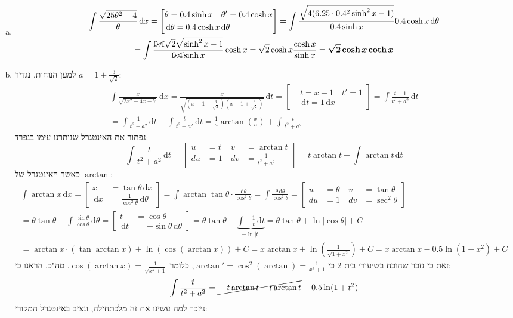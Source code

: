 \documentclass[]{article}
\newcommand\tant  {\tan \theta}
\newcommand\sinhx {\sinh x}
\newcommand\coshx {\cosh x}
\newcommand\dx    {\,\mathrm{d}x}
\newcommand\dt    {\,\mathrm{d}t}
\newcommand\dtt   {\,\mathrm{d}\theta}
\newcommand\ptt[3]{\csb{\begin{aligned}
			&\theta = #1 \quad \theta' = #2 \\
			&\dtt = #2 #3
\end{aligned}}}
\newcommand\pt[3]{\csb{\begin{aligned}
			&t = #1 \quad t' = #2 \\
			&\dt = #2 \dx #3
\end{aligned}}}
\newcommand\pts[2]{\csb{\begin{aligned}
t &= #1 \quad \\
\dt &= #2
\end{aligned}}}
\newcommand\pxs[2]{\csb{\begin{aligned}
x &= #1\\
\dx &= #2
\end{aligned}}}
\newcommand\udv[4]{\csb{\begin{aligned}
			u &= #1  \ & v &= #3 \\
			du &= #2 \ & dv &= #4
\end{aligned}}}
\newcommand\ta    {\theta}
\newcommand\cl [1]    {\left ( #1 \right )}
\newcommand\csb[1]    {\left [ #1 \right ]}
\begin{document}
	\section{}
	\begin{enumerate}[a.]
		\item 
			\begin{multline*}
				\int \frac{\sqrt{25\ta^2 - 4}}{\ta}\dx = \ptt{0.4\sinhx}{0.4\coshx}{\dtt} = \int \frac{\sqrt{4(6.25 \cdot 0.4^2\sinh^2x - 1)}}{0.4\sinhx} 0.4\coshx\dtt \\
				= \int \frac{\cancel{0.4}\sqrt2\sqrt{\sinh^2x - 1}}{\cancel{0.4}\sinhx}\coshx = \sqrt{2}\coshx \frac{\coshx}{\sinhx} = \bm{\sqrt2 \coshx \coth x}
			\end{multline*}
		\item למען הנוחות, נגדיר $a = 1 + \frac{3}{\sqrt2}$: 
			\begin{multline*}
				\int \frac{x}{\sqrt{2x^2 - 4x - 7}} \dx = \frac{x}{\sqrt{\cl{x - 1 - \frac{3}{\sqrt2}}\cl{x - 1 + \frac{3}{\sqrt2}}}} \dt = \pt{x - 1}{1}{} = \int \frac{t + 1}{t^2 + a^2}\dt \\
				= \int \frac{1}{t^2 + a^2} \dt + \int \frac{t}{t^2 + a^2} \dt = \frac{1}{a}\arctan\cl{\frac{x}{a}} + \int \frac{t}{t^2 + a^2}
			\end{multline*}
			נפתור את האינטגרל שנותרנו עימו בנפרד: 
			\[ \int \frac{t}{t^2 + a^2} \dt = \udv{t}{1}{\arctan t}{\tfrac{1}{t^2 + a^2}} = t \arctan t - \int \arctan t \dt \]
			כאשר האינטגרל של $\arctan$: 
			\begin{multline*}
				\int \arctan x \dx = \pxs{\tant\dx}{\tfrac{1}{\cos^2\ta}\dtt} = \int \arctan \tant \cdot \frac{\dtt}{\cos^2 \ta} = \int \frac{\ta \dtt}{\cos^2\ta} = \udv{\ta}{1}{\tan\ta}{\sec^2\ta} \\
				= \ta \tan \ta - \int \frac{\sin\ta}{\cos\ta}\dtt = \pts{\cos \ta}{-\sin \ta \dtt} = \ta \tan \ta  - \underbrace{\int -\frac{1}{t} \dt}_{-\ln |t|} = \ta \tan \ta + \ln |\cos \ta| + C \\
				= \arctan x \cdot (\tan \arctan x) + \ln (\cos(\arctan x)) + C = x \arctan x + \ln \cl{\tfrac{1}{\sqrt{1 + x^2}}} + C = x\arctan x - 0.5 \ln (1 + x^2) + C
			\end{multline*}
			זאת כי נזכר שהוכח בשיעורי בית 2 כי $\arctan' = \cos^2(\arctan) = \frac{1}{x^2 + 1}$, כלומר $\cos(\arctan x) = \frac{1}{\sqrt{x^2 + 1}}$. סה"כ, הראנו כי: 
			\[ \int \frac{t}{t^2 + a^2} = \cancel{+\ t \arctan t - t \arctan t} - 0.5\ln(1 + t^2) \]
			ניזכר למה עשינו את זה מלכתחילה, ונציב באינטגרל המקורי: 
			\begin{multline*}

\end{multline*}
\end{enumerate}
\end{document}

